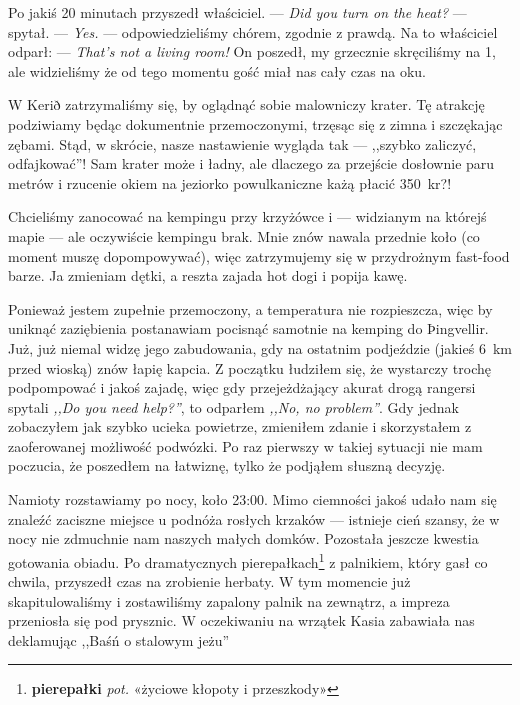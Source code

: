 \pagebreak

\noindent Po jakiś 20 minutach przyszedł właściciel. \newline
--- \emph{Did you turn on the heat?} --- spytał. \newline
--- \emph{Yes.} --- odpowiedzieliśmy chórem, zgodnie z prawdą. \newline
Na to właściciel odparł: \newline
--- \emph{That’s not a living room!} \newline
On poszedł, my grzecznie skręciliśmy na 1, ale widzieliśmy że od tego momentu gość miał nas cały czas na oku.


W Kerið zatrzymaliśmy się, by oglądnąć sobie malowniczy krater. Tę atrakcję podziwiamy będąc dokumentnie przemoczonymi, trzęsąc się z zimna i szczękając zębami. Stąd, w skrócie, nasze nastawienie wygląda tak --- ,,szybko zaliczyć, odfajkować''! Sam krater może i ładny, ale dlaczego za przejście dosłownie paru metrów i rzucenie okiem na jeziorko powulkaniczne każą płacić 350~kr?!

Chcieliśmy zanocować na kempingu przy krzyżówce  i  --- widzianym na którejś mapie --- ale oczywiście kempingu brak. Mnie znów nawala przednie koło (co moment muszę dopompowywać), więc zatrzymujemy się w przydrożnym fast-food barze. Ja zmieniam dętki, a reszta zajada hot dogi i popija kawę.

Ponieważ jestem zupełnie przemoczony, a temperatura nie rozpieszcza, więc by uniknąć zaziębienia postanawiam pocisnąć samotnie na kemping do Þingvellir. Już, już niemal widzę jego zabudowania, gdy na ostatnim podjeździe (jakieś 6~km przed wioską) znów łapię kapcia. Z początku łudziłem się, że wystarczy trochę podpompować i jakoś zajadę, więc gdy przejeżdżający akurat drogą rangersi spytali \emph{,,Do you need help?''}, to odparłem \emph{,,No, no problem''}. Gdy jednak zobaczyłem jak szybko ucieka powietrze, zmieniłem zdanie i skorzystałem z zaoferowanej możliwość podwózki. Po raz pierwszy w takiej sytuacji nie mam poczucia, że poszedłem na łatwiznę, tylko że podjąłem słuszną decyzję.

\pagebreak


Namioty rozstawiamy po nocy, koło 23:00. Mimo ciemności jakoś udało nam się znaleźć zaciszne miejsce u podnóża rosłych krzaków --- istnieje cień szansy, że w nocy nie zdmuchnie nam naszych małych domków. Pozostała jeszcze kwestia gotowania obiadu. Po dramatycznych pierepałkach\footnote{\textbf{pierepałki} \emph{pot.} «życiowe kłopoty i przeszkody»} z palnikiem, który gasł co chwila, przyszedł czas na zrobienie herbaty. W tym momencie już skapitulowaliśmy i zostawiliśmy zapalony palnik na zewnątrz, a impreza przeniosła się pod prysznic. W oczekiwaniu na wrzątek Kasia zabawiała nas deklamując ,,Baśń o stalowym jeżu'' \smile

